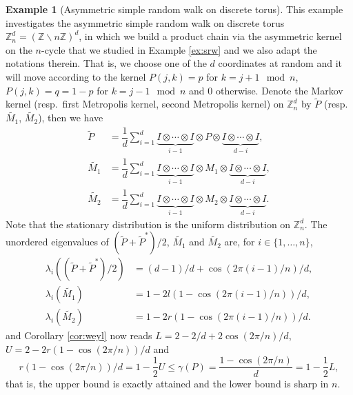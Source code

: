 \documentclass[12pt,a4]{amsart}
\numberwithin{equation}{section}
\theoremstyle{plain}
\theoremstyle{definition}
\newtheorem{example}{Example}[section]
\theoremstyle{remark}
\newcommand{\1}{\mathds{1}}
\renewcommand{\leq}{\leqslant}
\begin{document}
\begin{example}[Asymmetric simple random walk on discrete torus]\label{ex:torus}
	This example investigates the asymmetric simple random walk on discrete torus $\mathbb{Z}_n^d = (\mathbb{Z} \backslash n \mathbb{Z})^d$, in which we build a product chain via the asymmetric kernel on the $n$-cycle that we studied in Example \ref{ex:srw} and we also adapt the notations therein. That is, we choose one of the $d$ coordinates at random and it will move according to the kernel $P(j,k) = p$ for $k = j + 1 \mod{n}$, $P(j,k) = q = 1 - p$ for $k = j - 1 \mod{n}$ and $0$ otherwise. Denote the Markov kernel (resp.~first Metropolis kernel, second Metropolis kernel) on $\mathbb{Z}_n^d$ by $\widetilde{P}$ (resp.~$\widetilde{M_1}$, $\widetilde{M_2}$), then we have
	\begin{align*}
		\widetilde{P} &= \dfrac{1}{d} \sum_{i=1}^d \underbrace{I \otimes \cdots \otimes I}_{i-1} \otimes P \otimes \underbrace{I \otimes \cdots \otimes I}_{d-i}, \\
		\widetilde{M_1} &= \dfrac{1}{d} \sum_{i=1}^d \underbrace{I \otimes \cdots \otimes I}_{i-1} \otimes M_1 \otimes \underbrace{I \otimes \cdots \otimes I}_{d-i}, \\
		\widetilde{M_2} &= \dfrac{1}{d} \sum_{i=1}^d \underbrace{I \otimes \cdots \otimes I}_{i-1} \otimes M_2 \otimes \underbrace{I \otimes \cdots \otimes I}_{d-i}.		
	\end{align*}
	Note that the stationary distribution is the uniform distribution on $\mathbb{Z}_n^d$. The unordered eigenvalues of $(\widetilde{P}+\widetilde{P}^*)/2$, $\widetilde{M_1}$ and $\widetilde{M_2}$ are, for $i \in \{1,\ldots,n\}$,
	\begin{align*}
	\lambda_i((\widetilde{P}+\widetilde{P}^*)/2) &= (d-1)/d + \cos(2\pi (i-1)/n)/d, \\
	\lambda_i(\widetilde{M_1}) &= 1 - 2l(1-\cos(2\pi (i-1)/n))/d, \\
	\lambda_i(\widetilde{M_2}) &= 1 - 2r (1-\cos(2\pi (i-1)/n))/d.
	\end{align*}
	and Corollary \ref{cor:weyl} now reads $L=2-2/d+2\cos(2\pi/n)/d$, $U = 2 - 2r (1-\cos(2\pi/n))/d$ and
	$$r(1 - \cos (2\pi/n))/d = 1 - \dfrac{1}{2}U \leq \gamma(P) = \dfrac{1-\cos(2\pi/n)}{d} = 1 - \dfrac{1}{2}L,$$
	that is, the upper bound is exactly attained and the lower bound is sharp in $n$.
\end{example}
\end{document}
